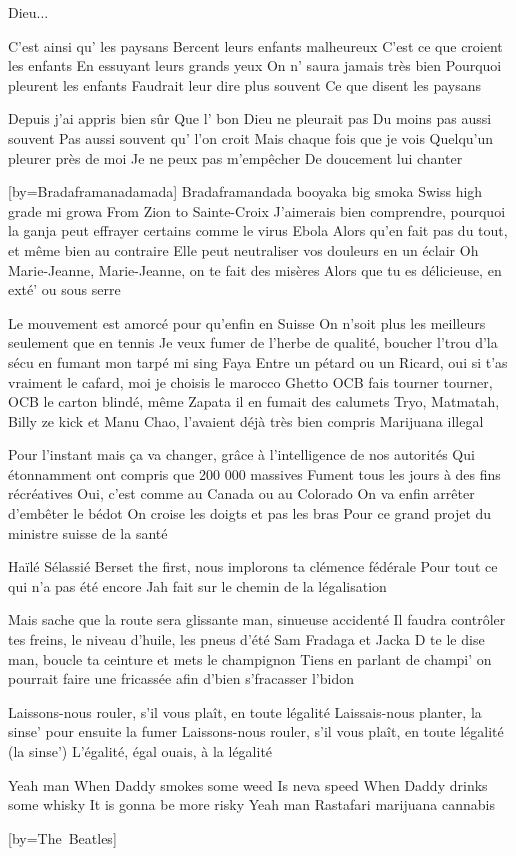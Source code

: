 Dieu...
\endchorus

\beginverse
C’est ainsi qu’ les paysans
Bercent leurs enfants malheureux
C’est ce que croient les enfants
En essuyant leurs grands yeux
On n’ saura jamais très bien
Pourquoi pleurent les enfants
Faudrait leur dire plus souvent
Ce que disent les paysans
\endverse

\beginverse
Depuis j’ai appris bien sûr
Que l’ bon Dieu ne pleurait pas
Du moins pas aussi souvent
Pas aussi souvent qu’ l’on croit
Mais chaque fois que je vois
Quelqu’un pleurer près de moi
Je ne peux pas m’empêcher
De doucement lui chanter
\endverse
\endsong


[by={Bradaframanadamada}]
\beginverse
Bradaframandada booyaka big smoka
Swiss high grade mi growa
From Zion to Sainte-Croix
\endverse
\beginverse
J'aimerais bien comprendre, pourquoi la ganja peut effrayer certains comme le virus Ebola
Alors qu'en fait pas du tout, et même bien au contraire
Elle peut neutraliser vos douleurs en un éclair
Oh Marie-Jeanne, Marie-Jeanne, on te fait des misères
Alors que tu es délicieuse, en exté' ou sous serre
\endverse

\beginverse
Le mouvement est amorcé pour qu'enfin en Suisse
On n'soit plus les meilleurs seulement que en tennis
Je veux fumer de l'herbe de qualité, boucher l'trou d'la sécu en fumant mon tarpé mi sing
Faya
Entre un pétard ou un Ricard, oui si t'as vraiment le cafard, moi je choisis le marocco
Ghetto
OCB fais tourner tourner, OCB le carton blindé, même Zapata il en fumait des calumets
Tryo, Matmatah, Billy ze kick et Manu Chao, l'avaient déjà très bien compris
Marijuana illegal
\endverse

\beginverse
Pour l'instant mais ça va changer, grâce à l'intelligence de nos autorités
Qui étonnamment ont compris que 200 000 massives
Fument tous les jours à des fins récréatives
Oui, c'est comme au Canada ou au Colorado
On va enfin arrêter d'embêter le bédot
On croise les doigts et pas les bras
Pour ce grand projet du ministre suisse de la santé
\endverse

\beginverse
Haïlé Sélassié Berset the first, nous implorons ta clémence fédérale
Pour tout ce qui n'a pas été encore Jah fait sur le chemin de la légalisation
\endverse

\beginverse
Mais sache que la route sera glissante man, sinueuse accidenté
Il faudra contrôler tes freins, le niveau d'huile, les pneus d'été
Sam Fradaga et Jacka D te le dise man, boucle ta ceinture et mets le champignon
Tiens en parlant de champi' on pourrait faire une fricassée afin d'bien s'fracasser l'bidon
\endverse

\beginverse
Laissons-nous rouler, s'il vous plaît, en toute légalité
Laissais-nous planter, la sinse' pour ensuite la fumer
Laissons-nous rouler, s'il vous plaît, en toute légalité (la sinse')
L'égalité, égal ouais, à la légalité
\endverse

\beginverse
Yeah man
When Daddy smokes some weed
Is neva speed
When Daddy drinks some whisky
It is gonna be more risky
Yeah man
Rastafari marijuana cannabis
\endverse
\endsong


[by={The\ Beatles}] \]\]\]\]\]\]\]\]\]\]\]\]\]\]\]\]\]\]\]\]\]\]\]\]\]\]\]\]\]\]\]\]\]\]\]\]\]\]\]\]\]\]\]\]\]\]\]\]\]\]\]\]\]\]\]\]\]\]\]\]\]\]\]\]\]\]\]\]\]\]\]\]\]\]\]\]\]\]\]\]\]\]\]\]\]\]\]\]\]\]\]\]\]\]\]\]\]\]\]\]\]\]\]\]\]\]\]\]\]\]\]\]\]\]\]\]\]\]\]\]\]\]\]\]\]\]\]\]\]\]\]\]\]\]\]\]\]\]\]\]\]\]\]\]\]\]\]\]\]\]\]\]\]\]\]\]\]\]\]\]\]\]\]\]\]\]\]\]\]\]\]\]\]\]\]\]\]\]\]\]\]\]\]\]\]\]\]\]\]\]\]\]\]\]\]\]\]\]\]\]\]\]\]\]\]\]\]\]\]\]\]\]\]\]\]\]\]\]\]\]\]\]\]\]\]\]\]\]\]\]\]\]\]\]\]\]\]\]\]\]\]\]\]\]\]\]\]\]\]\]\]\]\]\]\]\]\]\]\]\]\]\]\]\]\]\]\]\]\]\]\]\]\]\]\]\]\]\]\]\]\]\]\]\]\]\]\]\]\]\]\]\]\]\]\]\]\]\]\]\]\]\]\]\]\]\]\]\]\]\]\]\]\]\]\]\]\]\]\]\]\]\]\]\]\]\]\]\]\]\]\]\]\]\]\]\]\]\]\]\]\]\]\]\]\]\]\]\]\]\]\]\]\]\]\]\]\]\]\]\]\]\]\]\]\]\]\]\]\]\]\]\]\]\]\]\]\]\]\]\]\]\]\]\]\]\]\]\]\]\]\]\]\]\]\]\]\]\]\]\]\]\]\]\]\]\]\]\]\]\]\]\]\]\]\]\]\]\]\]\]\]\]\]\]\]\]\]\]\]\]\]\]\]\]\]\]\]\]\]\]\]\]\]\]\]\]\]\]\]\]\]\]\]\]\]\]\]\]\]\]\]\]\]\]\]\]\]\]\]\]\]\]\]\]\]\]\]\]\]\]\]\]\]\]\]\]\]\]\]\]\]\]\]\]\]\]\]\]\]\]\]\]\]\]\]\]\]\]\]\]\]\]\]\]\]\]\]\]\]\]\]\]\]\]\]\]\]\]\]\]\]\]\]\]\]\]\]\]\]\]\]\]\]\]\]\]\]\]\]\]\]\]\]\]\]\]\]\]\]\]\]\]\]\]\]\]\]\]\]\]\]\]\]\]\]\]\]\]\]\]\]\]\]\]\]\]\]\]\]\]\]\]\]\]\]\]\]\]\]\]\]\]\]\]\]\]\]\]\]\]\]\]\]\]\]\]\]\]\]\]\]\]\]\]\]\]\]\]\]\]\]\]\]\]\]\]\]\]\]\]\]\]\]\]\]\]\]\]\]\]\]\]\]\]\]\]\]\]\]\]\]\]\]\]\]\]\]\]\]\]\]\]\]\]\]\]\]\]\]\]\]\]\]\]\]\]\]\]\]\]\]\]\]\]\]\]\]\]\]\]\]\]\]\]\]\]\]\]\]\]\]\]\]\]\]\]\]\]\]\]\]\]\]\]\]\]\]\]\]\]\]\]\]\]\]\]\]\]\]\]\]\]\]\]\]\]\]\]\]\]\]\]\]\]\]\]\]\]\]\]\]\]\]\]\]\]\]\]\]\]\]\]\]\]\]\]\]\]\]\]\]\]\]\]\]\]\]\]\]\]\]\]\]\]\]\]\]\]\]\]\]\]\]\]\]\]\]\]\]\]\]\]\]\]\]\]\]\]\]\]\]\]\]\]\]\]\]\]\]\]\]\]\]\]\]\]\]\]\]\]\]\]\]\]\]\]\]\]\]\]\]\]\]\]\]\]\]\]\]\]\]\]\]\]\]\]\]\]\]\]\]\]\]\]\]\]\]\]\]\]\]\]\]\]\]\]\]\]\]\]\]\]\]\]\]\]\]\]\]\]\]\]\]\]\]\]\]\]\]\]\]\]\]\]\]\]\]\]\]\]\]\]\]\]\]\]\]\]\]\]\]\]\]\]\]\]\]\]\]\]\]\]\]\]\]\]\]\]\]\]\]\]\]\]\]\]\]\]\]\]\]\]\]\]\]\]\]\]\]\]\]\]\]\]\]\]\]\]\]\]\]\]\]\]\]\]\]\]\]\]\]\]\]\]\]\]\]\]\]\]\]\]\]\]\]\]\]\]\]\]\]\]\]\]\]\]\]\]\]\]\]\]\]\]\]\]\]\]\]\]\]\]\]\]\]\]\]\]\]\]\]\]\]\]\]\]\]\]\]\]\]\]\]\]\]\]\]\]\]\]\]\]\]\]\]\]\]\]\]\]\]\]\]\]\]\]\]\]\]\]\]\]\]\]\]\]\]\]\]\]\]\]\]\]\]\]\]\]\]\]\]\]\]\]\]\]\]\]\]\]\]\]\]\]\]\]\]\]\]\]\]\]\]\]\]\]\]\]\]\]\]\]\]\]\]\]\]\]\]\]\]\]\]\]\]\]\]\]\]\]\]\]\]\]\]\]\]\]\]\]\]\]\]\]\]\]\]\]\]\]\]\]\]\]\]\]\]\]\]\]\]\]\]\]\]\]\]\]\]\]\]\]\]\]\]\]\]\]\]\]\]\]\]\]\]\]\]\]\]\]\]\]\]\]\]\]\]\]\]\]\]\]\]\]\]\]\]\]\]\]\]\]\]\]\]\]\]\]\]\]\]\]\]\]\]\]\]\]\]\]\]\]\]\]\]\]\]\]\]\]\]\]\]\]\]\]\]\]\]\]\]\]\]\]\]\]\]\]\]\]\]\]\]\]\]\]\]\]\]\]\]\]\]\]\]\]\]\]\]\]\]\]\]\]\]\]\]\]\]\]\]\]\]\]\]\]\]\]\]\]\]\]\]\]\]\]\]\]\]\]\]\]\]\]\]\]\]\]\]\]\]\]\]\]\]\]\]\]\]\]\]\]\]\]\]\]\]\]\]\]\]\]\]\]\]\]\]\]\]\]\]\]\]\]\]\]\]\]\]\]\]\]\]\]\]\]\]\]\]\]\]\]\]\]\]\]\]\]\]\]\]\]\]\]\]\]\]\]\]\]\]\]\]\]\]\]\]\]\]\]\]\]\]\]\]\]\]\]\]\]\]\]\]\]\]\]
